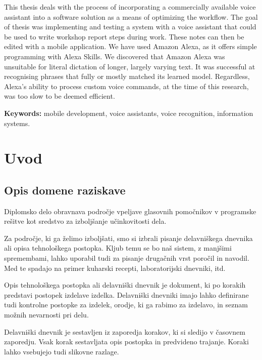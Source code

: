 \documentclass[a4paper, 12pt]{book}
\newcommand{\tkeywordsEn}{mobile development, voice assistants, voice recognition, information systems}
\newcommand{\clearemptydoublepage}{\newpage{\pagestyle{empty}\cleardoublepage}}
\begin{document}
\noindent This thesis deals with the process of incorporating a commercially available voice assistant into a software solution as a means of optimizing the workflow.
The goal of thesis was implementing and testing a system with a voice assistant that could be used to write workshop report steps during work.
These notes can then be edited with a mobile application.
We have used Amazon Alexa, as it offers simple programming with Alexa Skills.
We discovered that Amazon Alexa was unsuitable for literal dictation of longer, largely varying text.
It was successful at recognising phrases that fully or mostly matched its learned model.
Regardless, Alexa's ability to process custom voice commands, at the time of this research, was too slow to be deemed efficient.

\bigskip

\noindent\textbf{Keywords:} \tkeywordsEn.
\clearemptydoublepage

\mainmatter
\setcounter{page}{1}
\pagestyle{fancy}

\chapter{Uvod}
\section{Opis domene raziskave}

Diplomsko delo obravnava področje vpeljave glasovnih pomočnikov v programske rešitve kot sredstvo za izboljšanje učinkovitosti dela.

Za področje, ki ga želimo izboljšati, smo si izbrali pisanje delavniškega dnevnika ali opisa tehnološkega postopka.
Kljub temu se bo naš sistem, z manjšimi spremembami, lahko uporabil tudi za pisanje drugačnih vrst poročil in navodil.
Med te spadajo na primer kuharski recepti, laboratorijski dnevniki, itd.

Opis tehnološkega postopka ali delavniški dnevnik je dokument, ki po korakih predstavi postopek izdelave izdelka.
Delavniški dnevniki imajo lahko definirane tudi kontrolne postopke za izdelek, orodje, ki ga rabimo za izdelavo, in seznam možnih nevarnosti pri delu.

Delavniški dnevnik je sestavljen iz zaporedja korakov, ki si sledijo v časovnem zaporedju.
Vsak korak sestavljata opis postopka in predvideno trajanje.
Koraki lahko vsebujejo tudi slikovne razlage.
\end{document}
